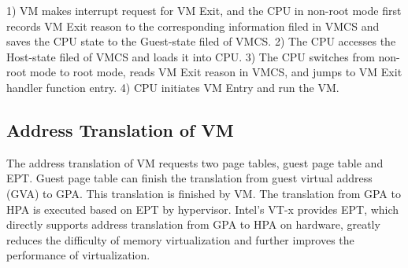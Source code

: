\documentclass[conference]{IEEEtran}
\begin{document}

1) VM makes interrupt request for VM Exit, and the CPU in non-root mode first records VM Exit reason to the corresponding information filed in VMCS and saves the CPU state to the Guest-state filed of VMCS.
2) The CPU accesses the Host-state filed of VMCS and loads it into CPU.
3) The CPU switches from non-root mode to root mode, reads VM Exit reason in VMCS, and jumps to VM Exit handler function entry.
4) CPU initiates VM Entry and run the VM.






\subsection{Address Translation of VM}
The address translation of VM requests two page tables, guest page table and EPT. Guest page table can finish the translation from guest virtual address (GVA) to GPA. This translation is finished by VM. The translation from GPA to HPA is executed based on EPT by hypervisor.
Intel's VT-x provides EPT, which directly supports address translation from GPA to HPA on hardware, greatly reduces the difficulty of memory virtualization and further improves the performance of virtualization.





%
%


\end{document}
